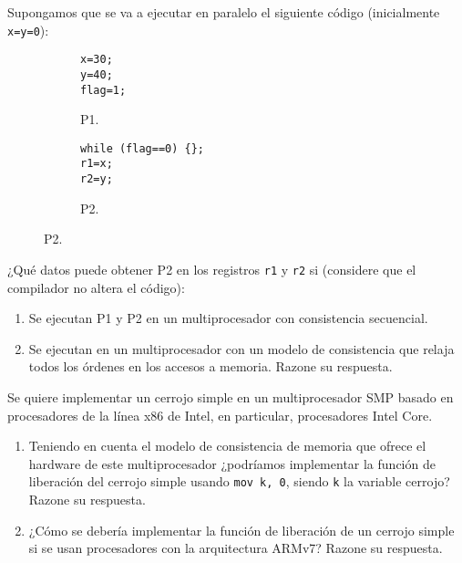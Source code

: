 \begin{ejercicio}
    Supongamos que se va a ejecutar en paralelo el siguiente código (inicialmente \verb|x=y=0|):
    \begin{figure}[H]
        \centering
        \begin{subfigure}{0.3\textwidth}
            \begin{verbatim}
x=30;
y=40;
flag=1;
            \end{verbatim}
            \caption{P1.}
        \end{subfigure}\hspace{3cm}
        \begin{subfigure}{0.3\textwidth}
            \begin{verbatim}
while (flag==0) {};
r1=x;
r2=y;
            \end{verbatim}
            \caption{P2.}            
        \end{subfigure}
    \end{figure}

    ¿Qué datos puede obtener P2 en los registros \verb|r1| y \verb|r2| si (considere que el compilador no altera el código):
    \begin{enumerate}
        \item Se ejecutan P1 y P2 en un multiprocesador con consistencia secuencial.
        \item Se ejecutan en un multiprocesador con un modelo de consistencia que relaja todos los órdenes en
        los accesos a memoria. Razone su respuesta.
    \end{enumerate}
\end{ejercicio}

\begin{ejercicio}
    Se quiere implementar un cerrojo simple en un multiprocesador SMP basado en procesadores de
    la línea x86 de Intel, en particular, procesadores Intel Core. 
    \begin{enumerate}
        \item Teniendo en cuenta el modelo de consistencia de memoria que ofrece el hardware de este multiprocesador ¿podríamos implementar la función de liberación del cerrojo simple usando \verb|mov k, 0|, siendo \verb|k| la variable cerrojo? Razone su respuesta.
        \item ¿Cómo se debería implementar la función de liberación de un cerrojo simple si se usan procesadores con la arquitectura ARMv7? Razone su respuesta.
    \end{enumerate}
\end{ejercicio}


